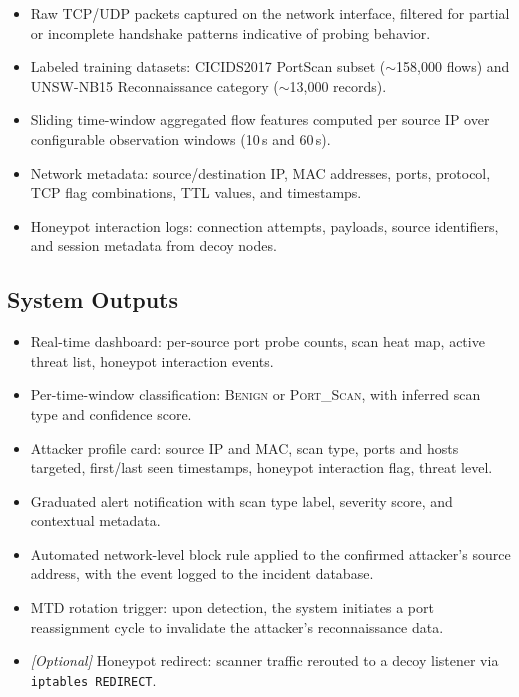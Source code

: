 \documentclass[12pt,a4paper]{article}
\begin{document}
\begin{itemize}[nosep,leftmargin=1.5em]
  \item Raw TCP/UDP packets captured on the network interface, filtered for
        partial or incomplete handshake patterns indicative of probing behavior.
  \item Labeled training datasets: CICIDS2017 PortScan subset ($\sim$158,000
        flows) and UNSW-NB15 Reconnaissance category ($\sim$13,000 records).
  \item Sliding time-window aggregated flow features computed per source IP
        over configurable observation windows (10\,s and 60\,s).
  \item Network metadata: source/destination IP, MAC addresses, ports,
        protocol, TCP flag combinations, TTL values, and timestamps.
  \item Honeypot interaction logs: connection attempts, payloads, source
        identifiers, and session metadata from decoy nodes.
\end{itemize}

\subsection{System Outputs}

\begin{itemize}[nosep,leftmargin=1.5em]
  \item Real-time dashboard: per-source port probe counts, scan heat map,
        active threat list, honeypot interaction events.
  \item Per-time-window classification: \textsc{Benign} or
        \textsc{Port\_Scan}, with inferred scan type and confidence score.
  \item Attacker profile card: source IP and MAC, scan type, ports and hosts
        targeted, first/last seen timestamps, honeypot interaction flag,
        threat level.
  \item Graduated alert notification with scan type label, severity score,
        and contextual metadata.
  \item Automated network-level block rule applied to the confirmed
        attacker's source address, with the event logged to the incident
        database.
  \item MTD rotation trigger: upon detection, the system initiates a port
        reassignment cycle to invalidate the attacker's reconnaissance data.
  \item \textit{[Optional]} Honeypot redirect: scanner traffic rerouted to a
        decoy listener via \texttt{iptables REDIRECT}.
\end{itemize}
\end{document}
